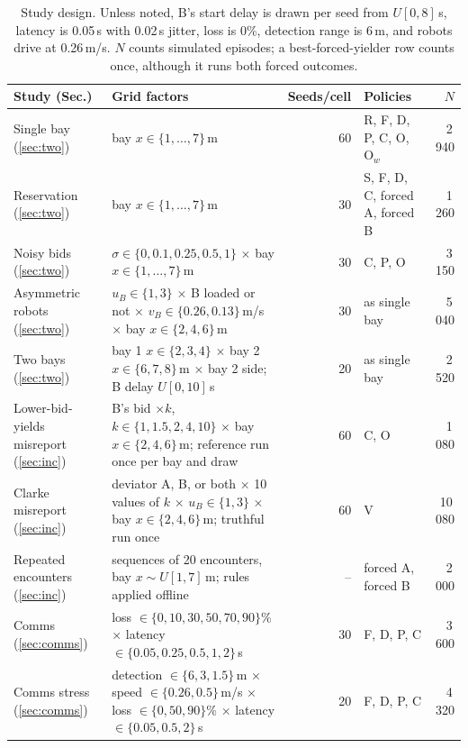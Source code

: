 \documentclass[letterpaper,journal]{IEEEtran}
\begin{document}
\begin{table}[t]\centering
\caption{Study design. Unless noted, B's start delay is drawn per seed from $U[0,8]$\,s, latency is 0.05\,s with 0.02\,s jitter, loss is 0\%, detection range is 6\,m, and robots drive at 0.26\,m/s. $N$ counts simulated episodes; a best-forced-yielder row counts once, although it runs both forced outcomes.}
\label{tab:design}
{\scriptsize\setlength{\tabcolsep}{4pt}
\begin{tabular}{@{}>{\raggedright\arraybackslash}p{}>{\raggedright\arraybackslash}p{}r>{\raggedright\arraybackslash}p{}r@{}}\toprule
Study (Sec.) & Grid factors & Seeds/cell & Policies & $N$\\\midrule
Single bay (\ref{sec:two}) & bay $x\in\{1,\dots,7\}$\,m & 60 & R, F, D, P, C, O, O$_w$ & 2\,940\\
Reservation (\ref{sec:two}) & bay $x\in\{1,\dots,7\}$\,m & 30 & S, F, D, C, forced A, forced B & 1\,260\\
Noisy bids (\ref{sec:two}) & $\sigma\in\{0,0.1,0.25,0.5,1\}$ $\times$ bay $x\in\{1,\dots,7\}$\,m & 30 & C, P, O & 3\,150\\
Asymmetric robots (\ref{sec:two}) & $u_B\in\{1,3\}$ $\times$ B loaded or not $\times$ $v_B\in\{0.26,0.13\}$\,m/s $\times$ bay $x\in\{2,4,6\}$\,m & 30 & as single bay & 5\,040\\
Two bays (\ref{sec:two}) & bay 1 $x\in\{2,3,4\}$ $\times$ bay 2 $x\in\{6,7,8\}$\,m $\times$ bay 2 side; B delay $U[0,10]$\,s & 20 & as single bay & 2\,520\\
Lower-bid-yields misreport (\ref{sec:inc}) & B's bid $\times k$, $k\in\{1,1.5,2,4,10\}$ $\times$ bay $x\in\{2,4,6\}$\,m; reference run once per bay and draw & 60 & C, O & 1\,080\\
Clarke misreport (\ref{sec:inc}) & deviator A, B, or both $\times$ 10 values of $k$ $\times$ $u_B\in\{1,3\}$ $\times$ bay $x\in\{2,4,6\}$\,m; truthful run once & 60 & V & 10\,080\\
Repeated encounters (\ref{sec:inc}) & 50 sequences of 20 encounters, bay $x\sim U[1,7]$\,m; rules applied offline & -- & forced A, forced B & 2\,000\\
Comms (\ref{sec:comms}) & loss $\in\{0,10,30,50,70,90\}$\% $\times$ latency $\in\{0.05,0.25,0.5,1,2\}$\,s & 30 & F, D, P, C & 3\,600\\
Comms stress (\ref{sec:comms}) & detection $\in\{6,3,1.5\}$\,m $\times$ speed $\in\{0.26,0.5\}$\,m/s $\times$ loss $\in\{0,50,90\}$\% $\times$ latency $\in\{0.05,0.5,2\}$\,s & 20 & F, D, P, C & 4\,320\\

\end{tabular}}
\end{table}
\end{document}
